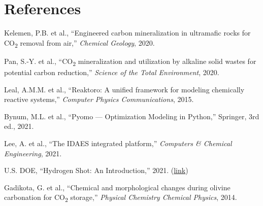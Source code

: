 \documentclass[11pt,a4paper]{article}
\begin{document}
\section*{References}

\begin{enumerate}[label={[\arabic*]}, noitemsep]
  \item \label{kelemen2020} Kelemen, P.B. et al., ``Engineered carbon mineralization in ultramafic rocks for CO\textsubscript{2} removal from air,'' \textit{Chemical Geology}, 2020.
  \item \label{pan2020} Pan, S.-Y. et al., ``CO\textsubscript{2} mineralization and utilization by alkaline solid wastes for potential carbon reduction,'' \textit{Science of the Total Environment}, 2020.
  \item Leal, A.M.M. et al., ``Reaktoro: A unified framework for modeling chemically reactive systems,'' \textit{Computer Physics Communications}, 2015.
  \item Bynum, M.L. et al., ``Pyomo --- Optimization Modeling in Python,'' Springer, 3rd ed., 2021.
  \item Lee, A. et al., ``The IDAES integrated platform,'' \textit{Computers \& Chemical Engineering}, 2021.
  \item U.S. DOE, ``Hydrogen Shot: An Introduction,'' 2021. (\href{https://www.energy.gov/eere/fuelcells/hydrogen-shot}{link})
  \item Gadikota, G. et al., ``Chemical and morphological changes during olivine carbonation for CO\textsubscript{2} storage,'' \textit{Physical Chemistry Chemical Physics}, 2014.
\end{enumerate}
\end{document}
